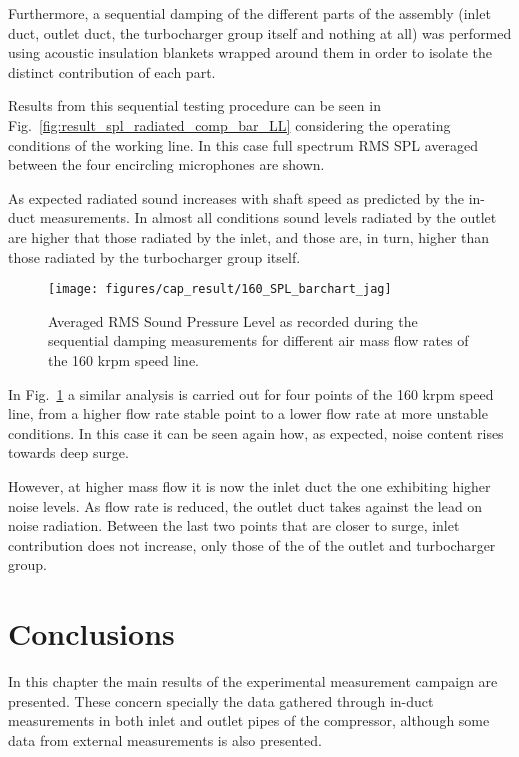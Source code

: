 Furthermore, a sequential damping of the different parts of the assembly (inlet duct, outlet duct, the turbocharger group itself and nothing at all) was performed using acoustic insulation blankets wrapped around them in order to isolate the distinct contribution of each part. 

Results from this sequential testing procedure can be seen in Fig.~\ref{fig:result_spl_radiated_comp_bar_LL} considering the operating conditions of the working line. In this case full spectrum RMS SPL averaged between the four encircling microphones are shown. 

As expected radiated sound increases with shaft speed as predicted by the in-duct measurements. In almost all conditions sound levels radiated by the outlet are higher that those radiated by the inlet, and those are, in turn, higher than those radiated by the turbocharger group itself.

\begin{figure}[tbh!]
\centering
\texttt{[image: figures/cap\_result/160\_SPL\_barchart\_jag]}
\caption{Averaged RMS Sound Pressure Level as recorded during the sequential damping measurements for different air mass flow rates of the 160 krpm speed line.}
\label{fig:result_spl_radiated_comp_bar_160}
\end{figure}

In Fig.~\ref{fig:result_spl_radiated_comp_bar_160} a similar analysis is carried out for four points of the 160 krpm speed line, from a higher flow rate stable point to a lower flow rate at more unstable conditions. In this case it can be seen again how, as expected, noise content rises towards deep surge.

However, at higher mass flow it is now the inlet duct the one exhibiting higher noise levels. As flow rate is reduced, the outlet duct takes against the lead on noise radiation. Between the last two points that are closer to surge, inlet contribution does not increase, only those of the of the outlet and turbocharger group.


\section{Conclusions}

In this chapter the main results of the experimental measurement campaign are presented. These concern specially the data gathered through in-duct measurements in both inlet and outlet pipes of the compressor, although some data from external measurements is also presented.

